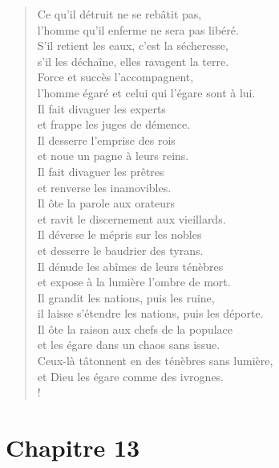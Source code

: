 \documentclass[french,twoside]{book} %
\def\mednobreak{\ifdim\lastskip<\medskipamount
  \removelastskip\nopagebreak\medskip\fi}
\newcommand{\labelblock}[1]{\medbreak{\noindent\color{rubric}\bfseries #1}\par\mednobreak}
\newcommand\chapteropen{} %
\newcommand\chaptercont{} %
\newcommand\chapterclose{} %
\begin{document}
\begin{verse}
Ce qu’il détruit ne se rebâtit pas, \\
l’homme qu’il enferme ne sera pas libéré.\\
S’il retient les eaux, c’est la sécheresse, \\
s’il les déchaîne, elles ravagent la terre.\\
Force et succès l’accompagnent, \\
l’homme égaré et celui qui l’égare sont à lui.\\
Il fait divaguer les experts \\
et frappe les juges de démence.\\
Il desserre l’emprise des rois \\
et noue un pagne à leurs reins.\\
Il fait divaguer les prêtres \\
et renverse les inamovibles.\\
Il ôte la parole aux orateurs \\
et ravit le discernement aux vieillards.\\
Il déverse le mépris sur les nobles \\
et desserre le baudrier des tyrans.\\
Il dénude les abîmes de leurs ténèbres \\
et expose à la lumière l’ombre de mort.\\
Il grandit les nations, puis les ruine, \\
il laisse s’étendre les nations, puis les déporte.\\
Il ôte la raison aux chefs de la populace \\
et les égare dans un chaos sans issue.\\
Ceux-là tâtonnent en des ténèbres sans lumière, \\
et Dieu les égare comme des ivrognes.\\!
\end{verse}
\chapterclose


\chapteropen
\chapter[{Chapitre 13}]{Chapitre 13}\renewcommand{\leftmark}{Chapitre 13}


\chaptercont

\labelblock{Plâtriers de mensonge}
\end{document}
